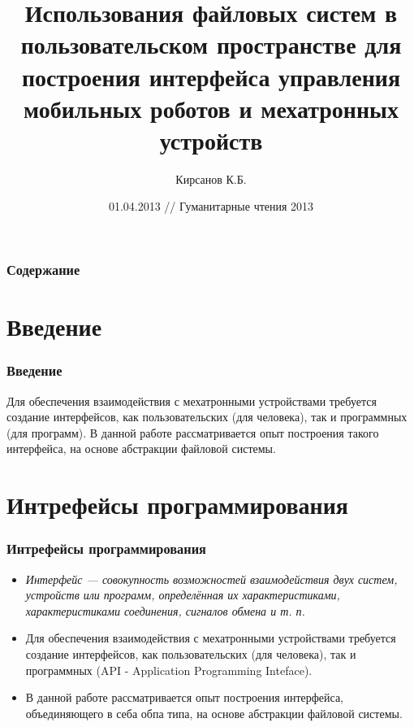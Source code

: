 \documentclass{beamer}
\title{Использования файловых систем в пользовательском пространстве для
построения интерфейса управления мобильных роботов и мехатронных устройств}
\author{Кирсанов К.Б.}
\institute[sensorika]
{ИПМ им. Келдыша РАН}
\date{01.04.2013 // Гуманитарные чтения 2013}
\begin{document}
\begin{frame}
\titlepage
\end{frame}

\begin{frame}
\frametitle{Содержание}
\tableofcontents
\end{frame}


\section{Введение}
\begin{frame}
\frametitle{Введение}
Для обеспечения взаимодействия с мехатронными устройствами требуется создание
интерфейсов, как пользовательских (для человека), так и программных (для программ). 
В данной работе рассматривается опыт построения такого интерфейса, на основе абстракции файловой системы.

\end{frame}


\section{Интрефейсы программирования}
\begin{frame}
\frametitle{Интрефейсы программирования}

\begin{itemize}
\item<1> \em{Интерфейс} — совокупность возможностей взаимодействия двух систем,
устройств или программ, определённая их характеристиками, характеристиками соединения, сигналов обмена и т. п.


\item<1> Для обеспечения взаимодействия с мехатронными устройствами требуется
создание интерфейсов, как пользовательских (для человека), так и программных (API -
Application Programming Inteface). 


\item<1> В данной работе рассматривается опыт построения интерфейса,
объединяющего в себа обпа типа, на основе абстракции файловой системы.
\end{itemize}
\end{frame}
\end{document}
